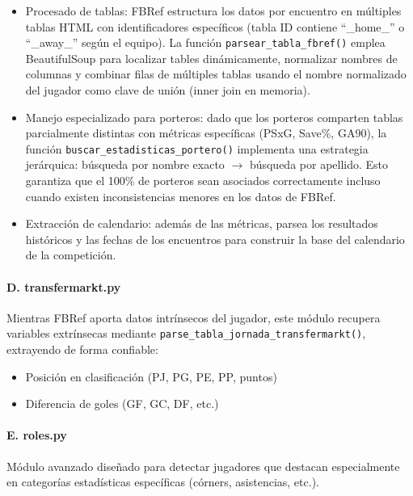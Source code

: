 \begin{itemize}
\item Procesado de tablas: FBRef estructura los datos por encuentro en múltiples tablas HTML con identificadores específicos (tabla ID contiene ``\_home\_'' o ``\_away\_'' según el equipo). La función \texttt{parsear\_tabla\_fbref()} emplea BeautifulSoup para localizar tables dinámicamente, normalizar nombres de columnas y combinar filas de múltiples tablas usando el nombre normalizado del jugador como clave de unión (inner join en memoria).
 
\item Manejo especializado para porteros: dado que los porteros comparten tablas parcialmente distintas con métricas específicas (PSxG, Save\%, GA90), la función \texttt{buscar\_estadisticas\_portero()} implementa una estrategia jerárquica: búsqueda por nombre exacto $\rightarrow$ búsqueda por apellido. Esto garantiza que el 100\% de porteros sean asociados correctamente incluso cuando existen inconsistencias menores en los datos de FBRef.
 
\item Extracción de calendario: además de las métricas, parsea los resultados históricos y las fechas de los encuentros para construir la base del calendario de la competición.
\end{itemize}
 
\paragraph{D. transfermarkt.py}
 
Mientras FBRef aporta datos intrínsecos del jugador, este módulo recupera variables extrínsecas mediante \texttt{parse\_tabla\_jornada\_transfermarkt()}, extrayendo de forma confiable:
 
\begin{itemize}
\item Posición en clasificación (PJ, PG, PE, PP, puntos)
\item Diferencia de goles (GF, GC, DF, etc.)
\end{itemize}
 
\paragraph{E. roles.py}
 
Módulo avanzado diseñado para detectar jugadores que destacan especialmente en categorías estadísticas específicas (córners, asistencias, etc.).
 
